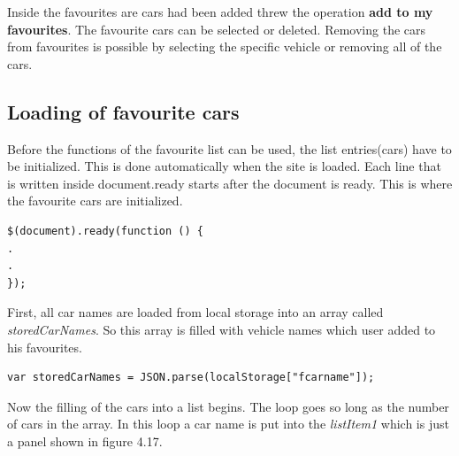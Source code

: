 Inside the favourites are cars had been added threw the operation \textbf{add to my favourites}. The favourite cars can be selected or deleted. Removing the cars from favourites is possible by selecting the specific vehicle or removing all of the cars.
\\

\subsection{Loading of favourite cars}
Before the functions of the favourite list can be used, the list entries(cars) have to be initialized. This is done automatically when the site is loaded. Each line that is written inside document.ready starts after the document is ready. This is where the favourite cars are initialized.
\\
\begin{lstlisting}[language=html, caption= 
source for document is ready,captionpos=b]
$(document).ready(function () {
.
.
});
\end{lstlisting}

First, all car names are loaded from local storage into an array called \textit{storedCarNames}. So this array is filled with vehicle names which user added to his favourites. 
\\

\begin{lstlisting}[language=html, caption= 
Array with favourite cars,captionpos=b]
var storedCarNames = JSON.parse(localStorage["fcarname"]); 
\end{lstlisting}

Now the filling of the cars into a list begins. The loop goes so long as the number of cars in the array. In this loop a car name is put into the \textit{listItem1} which is just a panel shown in figure 4.17.
\\

